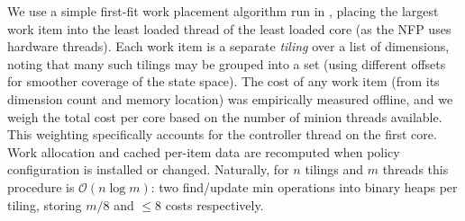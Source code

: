 We use a simple first-fit work placement algorithm run in \approachshort{}, placing the largest work item into the least loaded thread of the least loaded core (as the NFP uses hardware threads).
Each work item is a separate \emph{tiling} over a list of dimensions, noting that many such tilings may be grouped into a set (using different offsets for smoother coverage of the state space).
The cost of any work item (from its dimension count and memory location) was empirically measured offline, and we weigh the total cost per core based on the number of minion threads available.
This weighting specifically accounts for the controller thread on the first core.
Work allocation and cached per-item data are recomputed when policy configuration is installed or changed.
Naturally, for $n$ tilings and $m$ threads this procedure is $\mathcal{O}{\left(n\log{m}\right)}$: two find/update min operations into binary heaps per tiling, storing $m/8$ and $\le8$ costs respectively.

%

%
%
%

